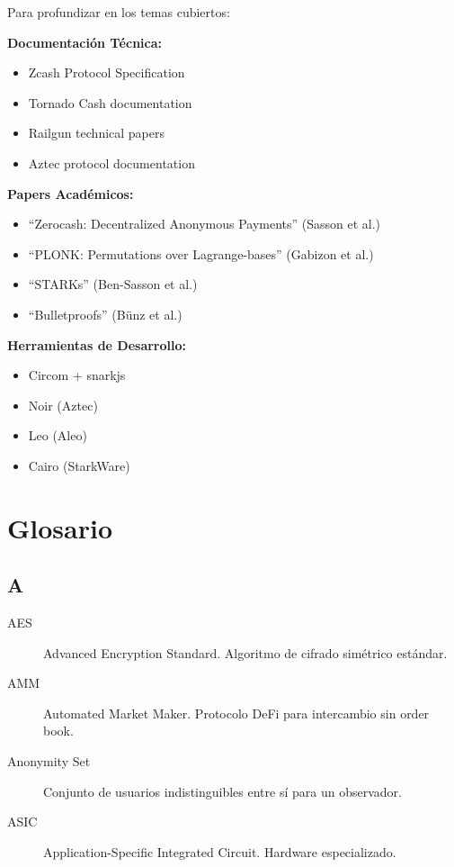 \documentclass[11pt,a4paper,twoside]{book}
\theoremstyle{definition}
\theoremstyle{remark}
\renewcommand{\cleardoublepage}{\clearpage}
\begin{document}
Para profundizar en los temas cubiertos:

\textbf{Documentación Técnica:}
\begin{itemize}
    \item Zcash Protocol Specification
    \item Tornado Cash documentation
    \item Railgun technical papers
    \item Aztec protocol documentation
\end{itemize}

\textbf{Papers Académicos:}
\begin{itemize}
    \item ``Zerocash: Decentralized Anonymous Payments'' (Sasson et al.)
    \item ``PLONK: Permutations over Lagrange-bases'' (Gabizon et al.)
    \item ``STARKs'' (Ben-Sasson et al.)
    \item ``Bulletproofs'' (Bünz et al.)
\end{itemize}

\textbf{Herramientas de Desarrollo:}
\begin{itemize}
    \item Circom + snarkjs
    \item Noir (Aztec)
    \item Leo (Aleo)
    \item Cairo (StarkWare)
\end{itemize}

\cleardoublepage

\chapter*{Glosario}

\section*{A}
\begin{description}
\item[AES] Advanced Encryption Standard. Algoritmo de cifrado simétrico estándar.
\item[AMM] Automated Market Maker. Protocolo DeFi para intercambio sin order book.
\item[Anonymity Set] Conjunto de usuarios indistinguibles entre sí para un observador.
\item[ASIC] Application-Specific Integrated Circuit. Hardware especializado.
\end{description}
\end{document}
